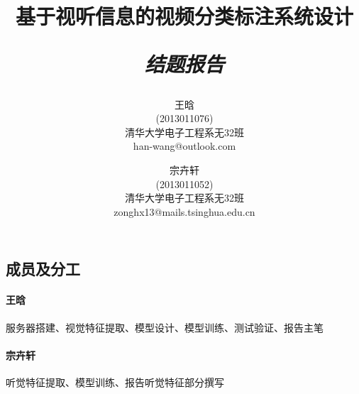 \documentclass{article}
\title{\textbf{基于视听信息的视频分类标注系统设计} \\ [1.5ex] \begin{large} \emph{结题报告} \end{large} }
\author{王晗 \\ (2013011076) \\ 清华大学电子工程系无32班 \\ han-wang@outlook.com
            \and
            宗卉轩 \\ (2013011052) \\ 清华大学电子工程系无32班 \\ zonghx13@mails.tsinghua.edu.cn}
\date{}
\begin{document}
    \maketitle

\begin{multicols}{2}
    \section{成员及分工}
        \paragraph{王晗}
        服务器搭建、视觉特征提取、模型设计、模型训练、测试验证、报告主笔

        \paragraph{宗卉轩}
        听觉特征提取、模型训练、报告听觉特征部分撰写


\end{multicols}
\end{document}
